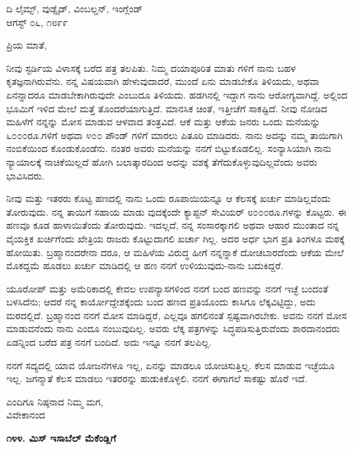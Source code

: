 \begin{flushright}
ದಿ ಲೈಮ್ಸ್, ವುಡ್ಸೈಡ್, ವಿಂಬಲ್ಡನ್, ಇಂಗ್ಲೆಂಡ್\\ಆಗಸ್ಟ್ ೦೬, ೧೮೯೯
\end{flushright}

ಪ್ರಿಯ ಮಾತೆ,

ನೀವು ಸ್ಟರ್ಡಿಯ ವಿಳಾಸಕ್ಕೆ ಬರೆದ ಪತ್ರ ತಲಪಿತು. ನಿಮ್ಮ ದಯಾಪೂರಿತ ಮಾತು ಗಳಿಗೆ ನಾನು ಬಹಳ ಕೃತಜ್ಞನಾಗಿರುವೆನು. ನನ್ನ ವಿಷಯವಾಗಿ ಹೇಳುವುದಾದರೆ, ಮುಂದೆ ಏನು ಮಾಡಬೇಕೊ ತಿಳಿಯದು, ಅಥವಾ ಏನನ್ನಾದರೂ ಮಾಡಬೇಕಾಗಿರುವುದೇ ಎಂಬುದೂ ತಿಳಿಯದು. ಹಡಗಿನಲ್ಲಿ ಇದ್ದಾಗ ನಾನು ಆರೋಗ್ಯವಾಗಿದ್ದೆ. ಅಲ್ಲಿಂದ ಭೂಮಿಗೆ ಇಳಿದ ಮೇಲೆ ಮತ್ತೆ ತೊಂದರೆಯಾಗುತ್ತಿದೆ. ಮಾನಸಿಕ ಚಿಂತೆ, ಇತ್ತೀಚೆಗೆ ಸಾಕಷ್ಟಿದೆ. ನೀವು ನೋಡಿದ ಮಹಿಳೆಗೆ ನನ್ನನ್ನು ಮೋಸ ಮಾಡುವ ಆಳವಾದ ತಂತ್ರವಿದೆ. ಆಕೆ ಮತ್ತು ಆಕೆಯ ಜನರು ಒಂದು ಮನೆಯನ್ನು ೬೦೦೦ರೂ.ಗಳಿಗೆ ಅಥವಾ ೪೦೦ ಪೌಂಡ್ ಗಳಿಗೆ ಮಾರಲು ಪಿತೂರಿ ಮಾಡಿದರು. ನಾನು ಅದನ್ನು ನಮ್ಮ ತಾಯಿಗಾಗಿ ನಂಬಿಕೆಯಿಂದ ಕೊಂಡುಕೊಂಡೆನು. ನಂತರ ಅವರು ಮನೆಯನ್ನು ನನಗೆ ಬಿಟ್ಟುಕೊಡಲಿಲ್ಲ. ಸಂನ್ಯಾಸಿಯಾಗಿ ನಾನು ನ್ಯಾಯಾಲಕ್ಕೆ ನಾಚಿಕೆಯಿಲ್ಲದೆ ಹೋಗಿ ಬಲಾತ್ಕಾರದಿಂದ ಅದನ್ನು ವಶಕ್ಕೆ ತೆಗೆದುಕೊಳ್ಳುವುದಿಲ್ಲವೆಂದು ಅವರು ಭಾವಿಸಿದರು.

ನೀವು ಮತ್ತು ಇತರರು ಕೊಟ್ಟ ಹಣದಲ್ಲಿ ನಾನು ಒಂದು ರೂಪಾಯಿಯನ್ನೂ ಆ ಕೆಲಸಕ್ಕೆ ಖರ್ಚು ಮಾಡಿಲ್ಲವೆಂದು ತೋರುವುದು. ನನ್ನ ತಾಯಿಗೆ ಸಹಾಯ ಮಾಡು ವುದಕ್ಕೆಂದೇ ಕ್ಯಾಪ್ಟನ್ ಸೇವಿಯರ್ ೮೦೦೦ರೂ.ಗಳನ್ನು ಕೊಟ್ಟರು. ಈ ಹಣವೂ ಕೂಡ ಹಾಳಾಯಿತೆಂದು ತೋರುವುದು. ಇದಲ್ಲದೆ, ನನ್ನ ಸಂಸಾರಕ್ಕಾಗಲಿ ಅಥವಾ ಆಹಾರ ಮುಂತಾದ ನನ್ನ ವೈಯಕ್ತಿಕ ಖರ್ಚಿಗೆಂದು ಖೇತ್ರಿಯ ರಾಜರು ಕೊಟ್ಟುದಾಗಲಿ ಖರ್ಚಾ ಗಿಲ್ಲ. ಅದರ ಅರ್ಧ ಭಾಗ ಪ್ರತಿ ತಿಂಗಳೂ ಮಠಕ್ಕೆ ಹೋಯಿತು. ಬ್ರಹ್ಮಾನಂದರೇನಾ ದರೂ, ಆ ಮಹಿಳೆಯ ವಿರುದ್ಧ ಹೀಗೆ ನನ್ನನ್ನಾಕೆ ದೋಚಬಾರದೆಂದು ಆಕೆಯ ಮೇಲೆ ಮೊಕದ್ದಮೆ ಹೂಡಲು ಖರ್ಚು ಮಾಡಿದಲ್ಲಿ ಆ ಹಣ ನನಗೆ ಉಳಿಯುವುದು-ನಾನು ಬದುಕಿದ್ದರೆ.

ಯೂರೋಪ್ ಮತ್ತು ಅಮೆರಿಕಾದಲ್ಲಿ ಕೇವಲ ಉಪನ್ಯಾಸಗಳಿಂದ ನನಗೆ ಬಂದ ಹಣವನ್ನು ನನಗೆ ಇಚ್ಛೆ ಬಂದಂತೆ ಬಳಸಿದೆನು; ಆದರೆ ನನ್ನ ಕಾರ್ಯೋದ್ದೇಶಕ್ಕೆಂದು ಬಂದ ಹಣದ ಪ್ರತಿಯೊಂದು ಕಾಸಿಗೂ ಲೆಕ್ಕವಿಟ್ಟಿದ್ದು, ಅದು ಮಠದಲ್ಲಿದೆ. ಬ್ರಹ್ಮಾನಂದ ನನಗೆ ಮೋಸ ಮಾಡಿದ್ದರೆ, ಎಲ್ಲವೂ ಹಗಲಿನಂತೆ ಸ್ಪಷ್ಟವಾಗಿರಬೇಕು. ಅವನು ನನಗೆ ಮೋಸ ಮಾಡುವನೆಂದು ನಾನು ಎಂದೂ ನಂಬುವುದಿಲ್ಲ. ಅವರು ಲೆಕ್ಕ ಪತ್ರಗಳನ್ನು ಸಿದ್ಧಪಡಿಸುತ್ತಿರುವೆಂದು ಶಾರದಾನಂದರು ಏಡನ್ನಿಂದ ಬರೆದ ಪತ್ರ ನನಗೆ ಬಂದಿದೆ. ಅದು ಇನ್ನೂ ನನಗೆ ತಲಪಿಲ್ಲ.

ನನಗೆ ಸದ್ಯದಲ್ಲಿ ಯಾವ ಯೋಜನೆಗಳೂ ಇಲ್ಲ, ಏನನ್ನು ಮಾಡಲೂ ಯೋಚಿಸುತ್ತಿಲ್ಲ. ಕೆಲಸ ಮಾಡುವ ಇಚ್ಛೆಯೂ ಇಲ್ಲ. ಜಗನ್ಮಾತೆ ಕೆಲಸ ಮಾಡಲು ಇತರರನ್ನು ಹುಡುಕಿಕೊಳ್ಳಲಿ. ನನಗೆ ಈಗಾಗಲೆ ಸಾಕಷ್ಟು ಹೊರೆ ಇದೆ.

\begin{flushright}
ಎಂದಿಗೂ ನಿಷ್ಠನಾದ ನಿಮ್ಮ ಮಗ,\\ವಿವೇಕಾನಂದ
\end{flushright}

\begin{center}
\textbf{೧೪೪. ಮಿಸ್ ಇಸಾಬೆಲ್ ಮೆಕೆಂಡ್ಲಿಗೆ}
\end{center}

